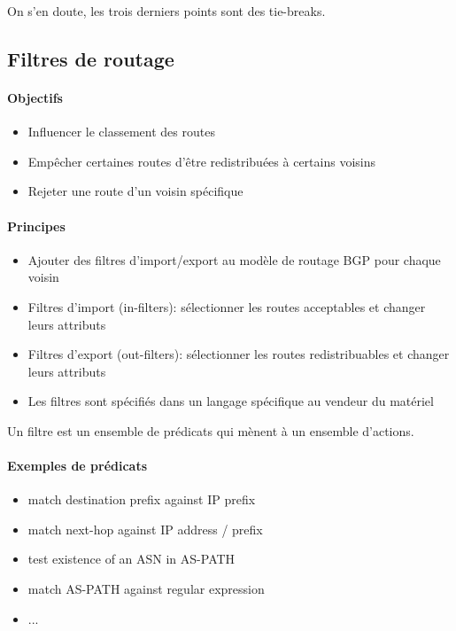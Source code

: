 \documentclass{report}
\begin{document}
On s'en doute, les trois derniers points sont des tie-breaks.

\subsection{Filtres de routage}

\paragraph{Objectifs}

\begin{itemize}
\item Influencer le classement des routes
\item Empêcher certaines routes d'être redistribuées à certains voisins
\item Rejeter une route d'un voisin spécifique
\end{itemize}

\paragraph{Principes}

\begin{itemize}
\item Ajouter des filtres d'import/export au modèle de routage BGP
  pour chaque voisin
\item Filtres d'import (in-filters): sélectionner les routes
  acceptables et changer leurs attributs
\item Filtres d'export (out-filters): sélectionner les routes
  redistribuables et changer leurs attributs
\item Les filtres sont spécifiés dans un langage spécifique au vendeur
  du matériel
\end{itemize}

Un filtre est un ensemble de prédicats qui mènent à un ensemble
d'actions.

\paragraph{Exemples de prédicats}

\begin{itemize}
\item match destination prefix against IP prefix
\item match next-hop against IP address / prefix
\item test existence of an ASN in AS-PATH
\item match AS-PATH against regular expression
\item ...
\end{itemize}
\end{document}
